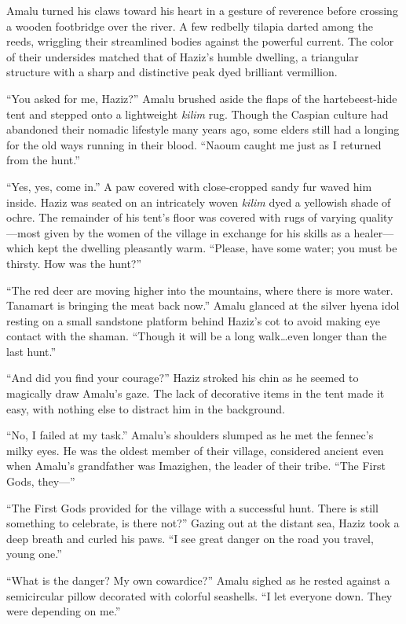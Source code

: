 Amalu turned his claws toward his heart in a gesture of reverence before crossing a wooden footbridge over the river. A few redbelly tilapia darted among the reeds, wriggling their streamlined bodies against the powerful current. The color of their undersides matched that of Haziz's humble dwelling, a triangular structure with a sharp and distinctive peak dyed brilliant vermillion.

``You asked for me, Haziz?'' Amalu brushed aside the flaps of the hartebeest-hide tent and stepped onto a lightweight \emph{kilim} rug. Though the Caspian culture had abandoned their nomadic lifestyle many years ago, some elders still had a longing for the old ways running in their blood. ``Naoum caught me just as I returned from the hunt.''

``Yes, yes, come in.'' A paw covered with close-cropped sandy fur waved him inside. Haziz was seated on an intricately woven \emph{kilim} dyed a yellowish shade of ochre. The remainder of his tent's floor was covered with rugs of varying quality---most given by the women of the village in exchange for his skills as a healer---which kept the dwelling pleasantly warm. ``Please, have some water; you must be thirsty. How was the hunt?''

``The red deer are moving higher into the mountains, where there is more water. Tanamart is bringing the meat back now.'' Amalu glanced at the silver hyena idol resting on a small sandstone platform behind Haziz's cot to avoid making eye contact with the shaman. ``Though it will be a long walk\ldots{}even longer than the last hunt.''

``And did you find your courage?'' Haziz stroked his chin as he seemed to magically draw Amalu's gaze. The lack of decorative items in the tent made it easy, with nothing else to distract him in the background.

``No, I failed at my task.'' Amalu's shoulders slumped as he met the fennec's milky eyes. He was the oldest member of their village, considered ancient even when Amalu's grandfather was Imazighen, the leader of their tribe. ``The First Gods, they---''

``The First Gods provided for the village with a successful hunt. There is still something to celebrate, is there not?'' Gazing out at the distant sea, Haziz took a deep breath and curled his paws. ``I see great danger on the road you travel, young one.''

``What is the danger? My own cowardice?'' Amalu sighed as he rested against a semicircular pillow decorated with colorful seashells. ``I let everyone down. They were depending on me.''

